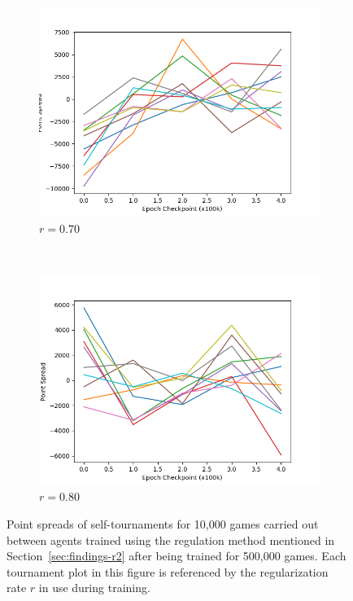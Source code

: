 \begin{figure}
	\begin{subfigure}[t]{0.48\textwidth}
		\center
		\includegraphics[width=\textwidth]{images/findings/experiments/regularization/tourny/reg_070-kyttuhat-strict-500k.png}
		\caption{$r = 0.70$}
		\label{fig:reg-tournies-0.70}
	\end{subfigure}
	~
	\begin{subfigure}[t]{0.48\textwidth}
		\center
		\includegraphics[width=\textwidth]{images/findings/experiments/regularization/tourny/reg_080-kyttuhat-strict-500k.png}
		\caption{$r = 0.80$}
		\label{fig:reg-tournies-0.80}
	\end{subfigure}

\caption{
	Point spreads of self-tournaments for 10,000 games
	carried out between agents trained using
	the regulation method mentioned in Section~\ref{sec:findings-r2} after being
	trained for 500,000 games.
	Each tournament plot in this figure is referenced by the regularization
	rate $r$ in use during training.
}
\label{fig:reg-tournies}
\end{figure}
